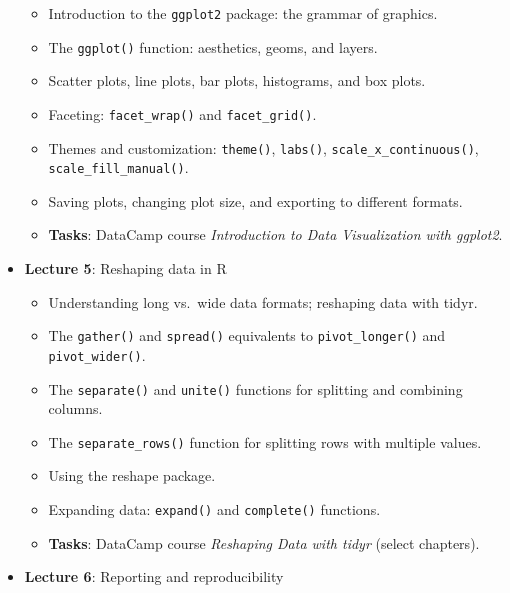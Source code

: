 \documentclass[
  letterpaper,
  DIV=11,
  numbers=noendperiod]{scrartcl}
\providecommand{\tightlist}{%
  \setlength{\itemsep}{0pt}\setlength{\parskip}{0pt}}\usepackage{longtable,booktabs,array}
\begin{document}
\begin{itemize}
  \begin{itemize}
  \tightlist
  \item
    Introduction to the \texttt{ggplot2} package: the grammar of
    graphics.
  \item
    The \texttt{ggplot()} function: aesthetics, geoms, and layers.
  \item
    Scatter plots, line plots, bar plots, histograms, and box plots.
  \item
    Faceting: \texttt{facet\_wrap()} and \texttt{facet\_grid()}.
  \item
    Themes and customization: \texttt{theme()}, \texttt{labs()},
    \texttt{scale\_x\_continuous()}, \texttt{scale\_fill\_manual()}.
  \item
    Saving plots, changing plot size, and exporting to different
    formats.
  \item
    \textbf{Tasks}: DataCamp course \emph{Introduction to Data
    Visualization with ggplot2}.
  \end{itemize}
\item
  \textbf{Lecture 5}: Reshaping data in R

  \begin{itemize}
  \tightlist
  \item
    Understanding long vs.~wide data formats; reshaping data with tidyr.
  \item
    The \texttt{gather()} and \texttt{spread()} equivalents to
    \texttt{pivot\_longer()} and \texttt{pivot\_wider()}.
  \item
    The \texttt{separate()} and \texttt{unite()} functions for splitting
    and combining columns.
  \item
    The \texttt{separate\_rows()} function for splitting rows with
    multiple values.
  \item
    Using the reshape package.
  \item
    Expanding data: \texttt{expand()} and \texttt{complete()} functions.
  \item
    \textbf{Tasks}: DataCamp course \emph{Reshaping Data with tidyr}
    (select chapters).
  \end{itemize}
\item
  \textbf{Lecture 6}: Reporting and reproducibility


\end{itemize}
\end{document}
